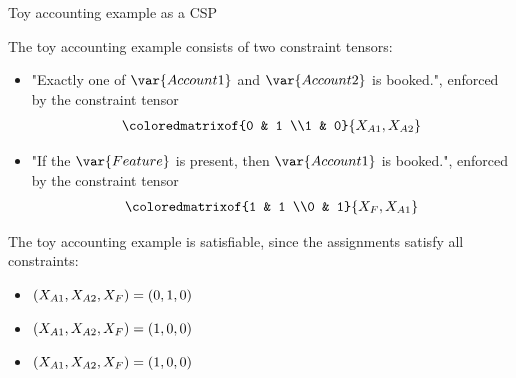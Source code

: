 \documentclass{beamer}
\begin{document}
    \begin{frame}{Toy accounting example as a CSP}

        The toy accounting example consists of two constraint tensors:
        \begin{itemize}
            \item "Exactly one of $\var{Account 1}$ and $\var{Account 2}$ is booked.", enforced by the constraint tensor
            \begin{align*}
                \coloredmatrixof{0 & 1 \\1 & 0}{\catvariableof{A1},\catvariableof{A2}}
            \end{align*}
            \item "If the $\var{Feature}$ is present, then $\var{Account 1}$ is booked.", enforced by the constraint tensor
            \begin{align*}
                \coloredmatrixof{1 & 1 \\0 & 1}{\catvariableof{F},\catvariableof{A1}}
            \end{align*}
        \end{itemize}

        The toy accounting example is satisfiable, since the assignments satisfy all constraints:
        \begin{itemize}
            \item $(X_{A1},X_{A2},X_{F})=(0,1,0)$
            \item $(X_{A1},X_{A2},X_{F})=(1,0,0)$
            \item $(X_{A1},X_{A2},X_{F})=(1,0,0)$
        \end{itemize}


    \end{frame}
\end{document}
